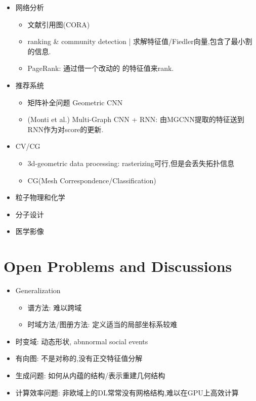 \documentclass{article}
\begin{document}
\begin{itemize}
    \item 网络分析
    \begin{itemize}
        \item 文献引用图(CORA)
        \item ranking \& community detection | 求解特征值/Fiedler向量,包含了最小割的信息. 
        \item PageRank: 通过借一个改动的 \lop 的特征值来rank.
    \end{itemize}
    \item 推荐系统
    \begin{itemize}
        \item 矩阵补全问题 \tRarr Geometric CNN
        \item (Monti et al.) Multi-Graph CNN + RNN: 由MGCNN提取的特征送到RNN作为对score的更新.
    \end{itemize}
    \item CV/CG
    \begin{itemize}
        \item 3d-geometric data processing: rasterizing可行,但是会丢失拓扑信息
        \item CG(Mesh Correspondence/Classification)
    \end{itemize}
    \item 粒子物理和化学
    \item 分子设计
    \item 医学影像
\end{itemize}

\section{Open Problems and Discussions}


\begin{itemize}
    \item Generalization
    \begin{itemize}
        \item 谱方法: 难以跨域
        \item 时域方法/图册方法: 定义适当的局部坐标系较难
    \end{itemize}
    \item 时变域: 动态形状, abnnormal social events
    \item 有向图: \lop 不是对称的,没有正交特征值分解
    \item 生成问题: 如何从内蕴的结构/表示重建几何结构
    \item 计算效率问题: 非欧域上的DL常常没有网格结构,难以在GPU上高效计算
\end{itemize}
\end{document}
